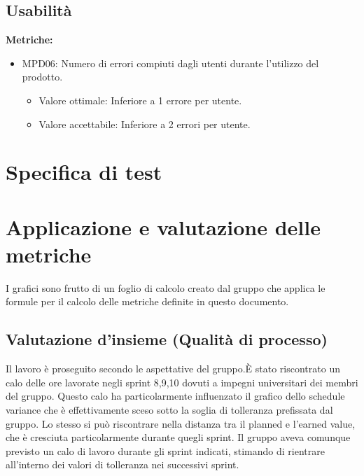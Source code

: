 \documentclass[12pt]{article}
\begin{document}
\subsection{Usabilità}
\textbf{Metriche:}
\begin{itemize}
	\item MPD06: Numero di errori compiuti dagli utenti durante l'utilizzo del prodotto.
	      \begin{itemize}
		      \item Valore ottimale: Inferiore a 1 errore per utente.
		      \item Valore accettabile: Inferiore a 2 errori per utente.
	      \end{itemize}
\end{itemize}


\section{Specifica di test}
\section {Applicazione e valutazione delle metriche}
I grafici sono frutto di un foglio di calcolo creato dal gruppo che applica le formule per il calcolo delle metriche definite in questo documento.

\subsection{Valutazione d’insieme (Qualità di processo)}
Il lavoro è proseguito secondo le aspettative del gruppo.È stato riscontrato un calo delle ore lavorate negli sprint 8,9,10 dovuti a impegni universitari dei membri del gruppo. Questo calo ha particolarmente influenzato il grafico dello schedule variance che è effettivamente sceso sotto la soglia di tolleranza prefissata dal gruppo. Lo stesso si può riscontrare nella distanza tra il planned e l’earned value, che è cresciuta particolarmente durante quegli sprint. Il gruppo aveva comunque previsto un calo di lavoro durante gli sprint indicati, stimando di rientrare all’interno dei valori di tolleranza nei successivi sprint. 
\end{document}
